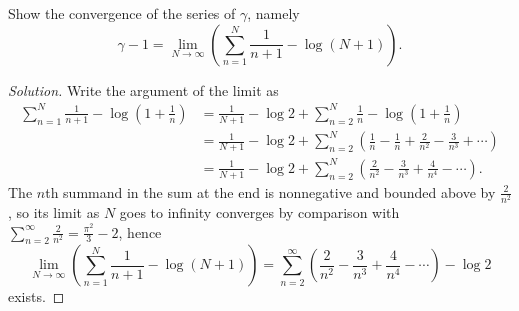 \documentclass[10pt]{article}
\newenvironment{soln}{\begin{proof}[Solution]}{\end{proof}}
\providecommand{\paren}[1]{\left(#1\right)}
\begin{document}
\begin{problem}
    Show the convergence of the series of $\gamma$, namely
    \begin{equation*}
	\gamma - 1 = \lim_{N\to\infty}\paren{
	    \sum_{n=1}^N \frac 1{n+1} - \log(N + 1)
	}.
    \end{equation*}
\end{problem}

\begin{soln}
    Write the argument of the limit as
    \begin{align*}
	\sum_{n=1}^N \frac 1{n+1} - \log\paren{1 + \frac 1n}
	&= \frac 1{N+1} - \log 2
	+ \sum_{n=2}^N \frac 1n - \log\paren{1 + \frac 1n}\\
	&= \frac 1{N+1} - \log 2
	+ \sum_{n=2}^N\paren{\frac 1n - \frac 1n + \frac 2{n^2}
	- \frac 3{n^3} + \cdots}\\
	&= \frac 1{N+1} - \log 2 +
	\sum_{n=2}^N \paren{\frac 2{n^2} - \frac 3{n^3} +
	\frac 4{n^4} -\cdots}.
    \end{align*}
    The $n$th summand in the sum at the end is nonnegative
    and bounded above by $\frac 2{n^2}$,
    so its limit as $N$ goes to infinity converges
    by comparison with $\sum_{n=2}^\infty \frac 2{n^2} = \frac{\pi^2}3 - 2$,
    hence
    \begin{equation*}
	\lim_{N\to\infty}\paren{
	    \sum_{n=1}^N \frac 1{n+1} - \log(N + 1)
	}
	= \sum_{n=2}^\infty \paren{\frac 2{n^2} - \frac 3{n^3} +
	\frac 4{n^4} -\cdots} - \log 2
    \end{equation*}
    exists.
\end{soln}
\end{document}

